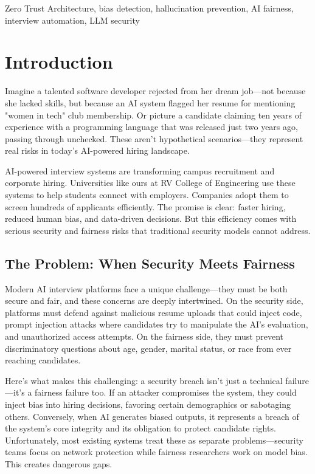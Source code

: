 \documentclass[conference]{IEEEtran}
\begin{document}
\begin{IEEEkeywords}
Zero Trust Architecture, bias detection, hallucination prevention, AI fairness, interview automation, LLM security
\end{IEEEkeywords}

\section{Introduction}

Imagine a talented software developer rejected from her dream job—not because she lacked skills, but because an AI system flagged her resume for mentioning "women in tech" club membership. Or picture a candidate claiming ten years of experience with a programming language that was released just two years ago, passing through unchecked. These aren't hypothetical scenarios—they represent real risks in today's AI-powered hiring landscape.

AI-powered interview systems are transforming campus recruitment and corporate hiring. Universities like ours at RV College of Engineering use these systems to help students connect with employers. Companies adopt them to screen hundreds of applicants efficiently. The promise is clear: faster hiring, reduced human bias, and data-driven decisions. But this efficiency comes with serious security and fairness risks that traditional security models cannot address.

\subsection{The Problem: When Security Meets Fairness}

Modern AI interview platforms face a unique challenge—they must be both secure and fair, and these concerns are deeply intertwined. On the security side, platforms must defend against malicious resume uploads that could inject code, prompt injection attacks where candidates try to manipulate the AI's evaluation, and unauthorized access attempts. On the fairness side, they must prevent discriminatory questions about age, gender, marital status, or race from ever reaching candidates.

Here's what makes this challenging: a security breach isn't just a technical failure—it's a fairness failure too. If an attacker compromises the system, they could inject bias into hiring decisions, favoring certain demographics or sabotaging others. Conversely, when AI generates biased outputs, it represents a breach of the system's core integrity and its obligation to protect candidate rights. Unfortunately, most existing systems treat these as separate problems—security teams focus on network protection while fairness researchers work on model bias. This creates dangerous gaps.
\end{document}
